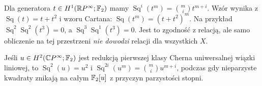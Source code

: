 \begin{przyklad}
Dla generatora $t\in H^1(\mathbb RP^\infty;\mathbb{F}_2)$ mamy
$\operatorname{Sq}^i(t^m)=\binom mi t^{m+i}$.
Wzór wynika z $\operatorname{Sq}(t)=t+t^2$ i
wzoru Cartana: $\operatorname{Sq}(t^m)=(t+t^2)^m$.
Na przykład
$\operatorname{Sq}^2\operatorname{Sq}^2(t^3)=0$,
a $\operatorname{Sq}^3\operatorname{Sq}^1(t^3)=0$.
Jest to zgodność z relacją, ale samo obliczenie na tej
przestrzeni \emph{nie dowodzi} relacji dla wszystkich $X$.
\end{przyklad}
\begin{przyklad}
Jeśli $u\in H^2(\mathbb CP^\infty;\mathbb{F}_2)$ jest redukcją
pierwszej klasy Cherna uniwersalnej wiązki liniowej, to
$\operatorname{Sq}^2(u)=u^2$ i
$\operatorname{Sq}^{2i}(u^m)=\binom mi u^{m+i}$,
podczas gdy nieparzyste kwadraty znikają na całym
$\mathbb{F}_2[u]$ z przyczyn parzystości stopni.
\end{przyklad}

